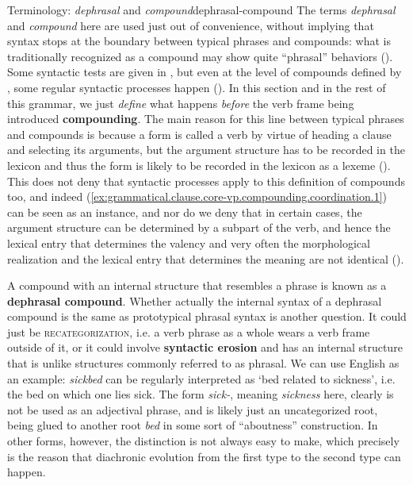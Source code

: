 \documentclass[UTF8, a4paper, oneside, scheme=plain, 12pt]{ctexrep}
\newcommand*{\citepages}[1]{pp.~{#1}}
\newcommand*{\concept}[1]{\textbf{#1}}
\newcommand*{\term}[1]{\emph{#1}}
\newcommand{\form}[1]{\emph{#1}}
\newcommand{\translate}[1]{`#1'}
\newcommand*{\category}[1]{\textsc{#1}}
\begin{document}
\begin{theorybox}{Terminology: \term{dephrasal} and \term{compound}}{dephrasal-compound}
    The terms \term{dephrasal} and \term{compound} here are used just out of convenience,
    without implying that syntax stops at the boundary between typical phrases and compounds:
    what is traditionally recognized as a compound may show quite ``phrasal'' behaviors 
    ().
    Some syntactic tests are given in \citet[\citepages{448-451}]{cgel},
    but even at the level of compounds defined by \citeauthor{cgel},
    some regular syntactic processes happen ().
    In this section and in the rest of this grammar, we just \emph{define} what happens \emph{before} the verb frame being introduced \concept{compounding}.
    The main reason for this line between typical phrases and compounds 
    is because a form is called a verb by virtue of heading a clause and selecting its arguments,
    but the argument structure has to be recorded in the lexicon
    and thus the form is likely to be recorded in the lexicon as a lexeme
    ().
    This does not deny that syntactic processes apply to this definition of compounds too,
    and indeed (\ref{ex:grammatical.clause.core-vp.compounding.coordination.1})
    can be seen as an instance,
    and nor do we deny that in certain cases,
    the argument structure can be determined by a subpart of the verb,
    and hence the lexical entry that determines the valency and very often the morphological realization
    and the lexical entry that determines the meaning are not identical
    ().

    A compound with an internal structure that resembles a phrase
    is known as a \concept{dephrasal compound}.
    Whether actually the internal syntax of a dephrasal compound is the same as prototypical phrasal syntax is another question.
    It could just be \category{recategorization}, i.e. a verb phrase as a whole wears a verb frame outside of it,
    or it could involve \concept{syntactic erosion} and has an internal structure that is unlike structures commonly referred to as phrasal.
    We can use English as an example:
    \form{sickbed} can be regularly interpreted as \translate{bed related to sickness}, 
    i.e. the bed on which one lies sick.
    The form \form{sick-}, meaning \form{sickness} here,
    clearly is not be used as an adjectival phrase,
    and is likely just an uncategorized root,
    being glued to another root \form{bed} in some sort of ``aboutness'' construction.
    In other forms, however, the distinction is not always easy to make,
    which precisely is the reason that diachronic evolution from the first type to the second type can happen.


\end{theorybox}
\end{document}
